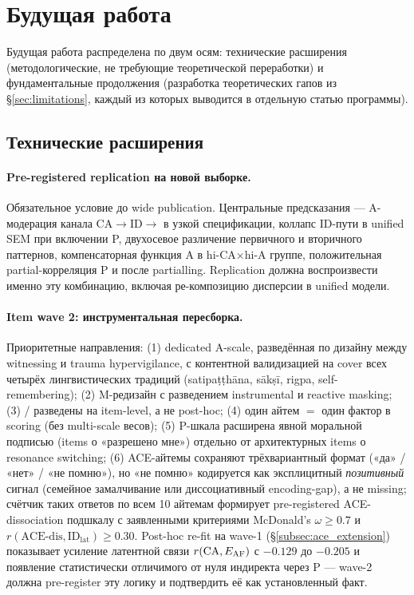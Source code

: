 \section{Будущая работа}
\label{sec:future}

Будущая работа \DEIC{} распределена по двум осям: технические расширения (методологические, не требующие теоретической переработки) и фундаментальные продолжения (разработка теоретических гапов из §\ref{sec:limitations}, каждый из которых выводится в отдельную статью программы).

\subsection{Технические расширения}

\paragraph{Pre-registered replication на новой выборке.} Обязательное условие до wide publication. Центральные предсказания --- A-модерация канала CA$\to$ID$\to$\EAF{} в узкой спецификации, коллапс ID-пути в unified SEM при включении P, двухосевое различение первичного и вторичного паттернов, компенсаторная функция A в hi-CA$\times$hi-A группе, положительная partial-корреляция P и \Ecog{} после partialling. Replication должна воспроизвести именно эту комбинацию, включая ре-композицию дисперсии в unified модели.

\paragraph{Item wave 2: инструментальная пересборка.} Приоритетные направления: (1) dedicated A-scale, разведённая по дизайну между witnessing и trauma hypervigilance, с контентной валидизацией на cover всех четырёх лингвистических традиций (satipaṭṭhāna, sākṣī, rigpa, self-remembering); (2) M-редизайн с разведением instrumental и reactive masking; (3) \EAF{}/\Ecog{} разведены на item-level, а не post-hoc; (4) один айтем $=$ один фактор в scoring (без multi-scale весов); (5) P-шкала расширена явной моральной подписью (items о «разрешено мне») отдельно от архитектурных items о resonance switching; (6) ACE-айтемы сохраняют трёхвариантный формат («да» / «нет» / «не помню»), но «не помню» кодируется как эксплицитный \emph{позитивный} сигнал (семейное замалчивание или диссоциативный encoding-gap), а не missing; счётчик таких ответов по всем 10 айтемам формирует pre-registered ACE-dissociation подшкалу с заявленными критериями McDonald's $\omega \ge 0.7$ и $r(\text{ACE-dis}, \text{ID}_{\mathrm{lat}}) \ge 0.30$. Post-hoc re-fit на wave-1 (§\ref{subsec:ace_extension}) показывает усиление латентной связи $r(\text{CA}, E_{\mathrm{AF}}{})$ с $-0.129$ до $-0.205$ и появление статистически отличимого от нуля индиректа через P --- wave-2 должна pre-register эту логику и подтвердить её как установленный факт.

